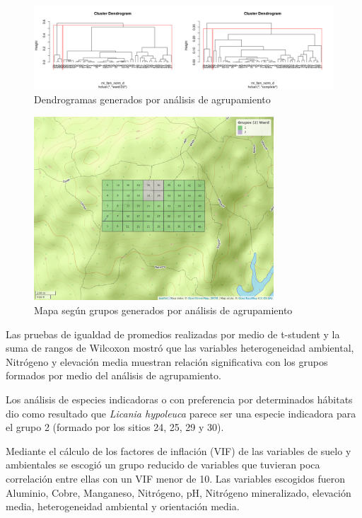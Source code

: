 \documentclass[11pt,]{article}
\begin{document}
\begin{figure}
\centering
\includegraphics[width=1.00000\textwidth]{Clusters.png}
\caption{Dendrogramas generados por análisis de
agrupamiento\label{clusters}}
\end{figure}

\begin{figure}
\centering
\includegraphics[width=0.80000\textwidth]{mapa_ward_k2.png}
\caption{Mapa según grupos generados por análisis de
agrupamiento\label{mapagrupos}}
\end{figure}

Las pruebas de igualdad de promedios realizadas por medio de t-student y
la suma de rangos de Wilcoxon mostró que las variables heterogeneidad
ambiental, Nitrógeno y elevación media muestran relación significativa
con los grupos formados por medio del análisis de agrupamiento.

Los análisis de especies indicadoras o con preferencia por determinados
hábitats dio como resultado que \emph{Licania hypoleuca} parece ser una
especie indicadora para el grupo 2 (formado por los sitios 24, 25, 29 y
30).

Mediante el cálculo de los factores de inflación (VIF) de las variables
de suelo y ambientales se escogió un grupo reducido de variables que
tuvieran poca correlación entre ellas con un VIF menor de 10. Las
variables escogidos fueron Aluminio, Cobre, Manganeso, Nitrógeno, pH,
Nitrógeno mineralizado, elevación media, heterogeneidad ambiental y
orientación media.
\end{document}

